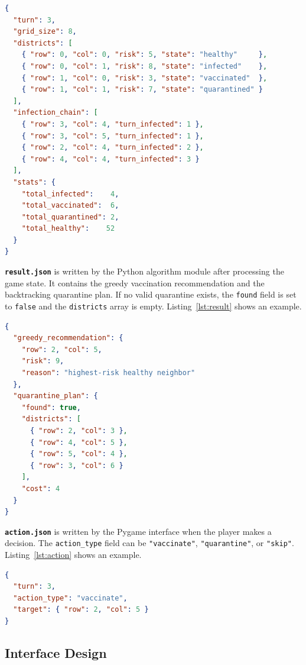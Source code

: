 \documentclass[12pt, a4paper]{article}
\begin{document}
\begin{lstlisting}[language=json, frame=single,
  caption={Example \texttt{state.json} at turn 3.},
  label={lst:state}]
{
  "turn": 3,
  "grid_size": 8,
  "districts": [
    { "row": 0, "col": 0, "risk": 5, "state": "healthy"     },
    { "row": 0, "col": 1, "risk": 8, "state": "infected"    },
    { "row": 1, "col": 0, "risk": 3, "state": "vaccinated"  },
    { "row": 1, "col": 1, "risk": 7, "state": "quarantined" }
  ],
  "infection_chain": [
    { "row": 3, "col": 4, "turn_infected": 1 },
    { "row": 3, "col": 5, "turn_infected": 1 },
    { "row": 2, "col": 4, "turn_infected": 2 },
    { "row": 4, "col": 4, "turn_infected": 3 }
  ],
  "stats": {
    "total_infected":    4,
    "total_vaccinated":  6,
    "total_quarantined": 2,
    "total_healthy":    52
  }
}
\end{lstlisting}

\textbf{\texttt{result.json}} is written by the Python algorithm module
after processing the game state. It contains the greedy vaccination
recommendation and the backtracking quarantine plan. If no valid quarantine
exists, the \texttt{found} field is set to \texttt{false} and the
\texttt{districts} array is empty. Listing~\ref{lst:result} shows an example.

\begin{lstlisting}[language=json, frame=single,
  caption={Example \texttt{result.json}.},
  label={lst:result}]
{
  "greedy_recommendation": {
    "row": 2, "col": 5,
    "risk": 9,
    "reason": "highest-risk healthy neighbor"
  },
  "quarantine_plan": {
    "found": true,
    "districts": [
      { "row": 2, "col": 3 },
      { "row": 4, "col": 5 },
      { "row": 5, "col": 4 },
      { "row": 3, "col": 6 }
    ],
    "cost": 4
  }
}
\end{lstlisting}

\textbf{\texttt{action.json}} is written by the Pygame interface when the
player makes a decision. The \texttt{action\_type} field can be
\texttt{"vaccinate"}, \texttt{"quarantine"}, or \texttt{"skip"}.
Listing~\ref{lst:action} shows an example.

\begin{lstlisting}[language=json, frame=single,
  caption={Example \texttt{action.json}.},
  label={lst:action}]
{
  "turn": 3,
  "action_type": "vaccinate",
  "target": { "row": 2, "col": 5 }
}
\end{lstlisting}

\subsection{Interface Design}
\end{document}
